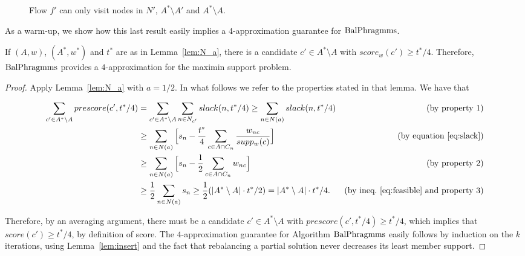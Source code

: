 \begin{figure}[tb]
\begin{center}
{
}
\end{center}
\caption{Flow $f'$ can only visit nodes in $N'$, $A^*\setminus A'$ and $A^*\setminus A$.}
\label{fig:sets}
\end{figure}

As a warm-up, we show how this last result easily implies a $4$-approximation guarantee for $\operatorname{BalPhragmms}$.

\begin{lemma}
If $(A,w)$, $(A^*,w^*)$ and $t^*$ are as in Lemma~\ref{lem:N_a}, there is a candidate $c'\in A^*\setminus A$ with $score_w(c')\geq t^*/4$. Therefore, $\operatorname{BalPhragmms}$ provides a $4$-approximation for the maximin support problem.
\end{lemma}

\begin{proof}
Apply Lemma~\ref{lem:N_a} with $a=1/2$. In what follows we refer to the properties stated in that lemma. We have that

\begin{align*}
    \sum_{c'\in A^*\setminus A} prescore(c',t^*/4) &=\sum_{c'\in A^*\setminus A} \sum_{n\in N_{c'}} slack(n,t^*/4)
    \geq \sum_{n\in N(a)} slack(n,t^*/4) & \text{(by property 1)}\\
    &\geq \sum_{n\in N(a)} \Big[ s_n - \frac{t^*}{4}\sum_{c\in A\cap C_n} \frac{w_{nc}}{supp_w(c)} \Big] &\text{(by equation \ref{eq:slack})}\\
    &\geq \sum_{n\in N(a)} \Big[ s_n - \frac{1}{2}\sum_{c\in A\cap C_n} w_{nc} \Big] &\text{(by property 2)}\\
    &\geq \frac{1}{2}\sum_{n\in N(a)} s_n 
		\geq \frac{1}{2} (|A^*\setminus A|\cdot t^*/2) = |A^*\setminus A|\cdot t^*/4. 
    &\text{(by ineq.~\ref{eq:feasible} and property 3)}
\end{align*}

Therefore, by an averaging argument, there must be a candidate $c'\in A^*\setminus A$ with $prescore(c',t^*/4)\geq t^*/4$, which implies that $score(c')\geq t^*/4$, by definition of score. The $4$-approximation guarantee for Algorithm $\operatorname{BalPhragmms}$ easily follows by induction on the $k$ iterations, using Lemma~\ref{lem:insert} and the fact that rebalancing a partial solution never decreases its least member support.
\end{proof}

